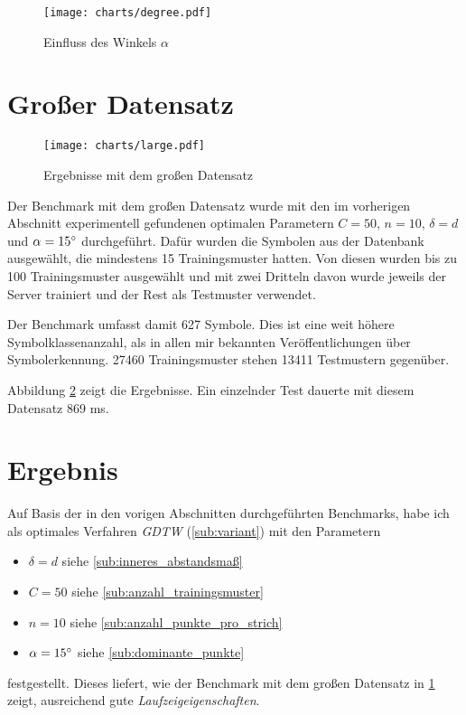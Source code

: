 \begin{figure}[htbp]
  \begin{center}
    \texttt{[image: charts/degree.pdf]}
  \end{center}
  \caption{Einfluss des Winkels $\alpha$}
  \label{chart:degree}
\end{figure}


\section{Großer Datensatz}
\label{sec:grosser_datensatz}

\begin{figure}[htbp]
  \begin{center}
    \texttt{[image: charts/large.pdf]}
  \end{center}
  \caption{Ergebnisse mit dem großen Datensatz}
  \label{chart:large}
\end{figure}

Der Benchmark mit dem großen Datensatz wurde mit den im vorherigen Abschnitt experimentell gefundenen optimalen Parametern $C=50$, $n=10$, $\delta=d$ und $\alpha=15\degree$ durchgeführt. Dafür wurden die Symbolen aus der Datenbank ausgewählt, die mindestens 15 Trainingsmuster hatten. Von diesen wurden bis zu 100 Trainingsmuster ausgewählt und mit zwei Dritteln davon wurde jeweils der Server trainiert und der Rest als Testmuster verwendet.

Der Benchmark umfasst damit 627 Symbole. Dies ist eine weit höhere Symbolklassenanzahl, als in allen mir bekannten Veröffentlichungen über Symbolerkennung. 27460 Trainingsmuster stehen 13411 Testmustern gegenüber.

Abbildung \ref{chart:large} zeigt die Ergebnisse. Ein einzelnder Test dauerte mit diesem Datensatz 869 ms.

\section{Ergebnis}

Auf Basis der in den vorigen Abschnitten durchgeführten Benchmarks, habe ich als optimales Verfahren \emph{GDTW} (\ref{sub:variant}) mit den Parametern
\begin{itemize}
  \item $\delta=d$ \hfill siehe \ref{sub:inneres_abstandsmaß}
  \item $C=50$ \hfill siehe \ref{sub:anzahl_trainingsmuster}
  \item $n=10$ \hfill siehe \ref{sub:anzahl_punkte_pro_strich}
  \item $\alpha=15\degree$ \hfill siehe \ref{sub:dominante_punkte}
\end{itemize}
festgestellt. Dieses liefert, wie der Benchmark mit dem großen Datensatz in \ref{sec:grosser_datensatz} zeigt, ausreichend gute \emph{Laufzeigeigenschaften}.

